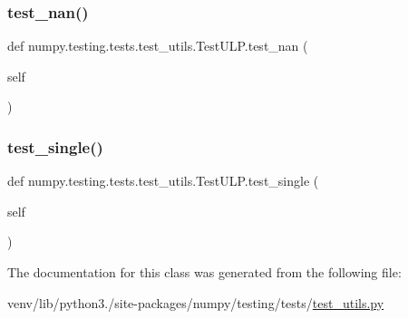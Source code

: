 \subsubsection{\texorpdfstring{test\+\_\+nan()}{test\_nan()}}
{\footnotesize\ttfamily def numpy.\+testing.\+tests.\+test\+\_\+utils.\+Test\+U\+L\+P.\+test\+\_\+nan (\begin{DoxyParamCaption}\item[{}]{self }\end{DoxyParamCaption})}

\mbox{\label{classnumpy_1_1testing_1_1tests_1_1test__utils_1_1TestULP_a7865551d14b2eb55f1087aad6f74f020}} 
\subsubsection{\texorpdfstring{test\+\_\+single()}{test\_single()}}
{\footnotesize\ttfamily def numpy.\+testing.\+tests.\+test\+\_\+utils.\+Test\+U\+L\+P.\+test\+\_\+single (\begin{DoxyParamCaption}\item[{}]{self }\end{DoxyParamCaption})}



The documentation for this class was generated from the following file\+:\begin{DoxyCompactItemize}
\item 
venv/lib/python3./site-\/packages/numpy/testing/tests/\hyperlink{numpy_2testing_2tests_2test__utils_8py}{test\+\_\+utils.\+py}\end{DoxyCompactItemize}
